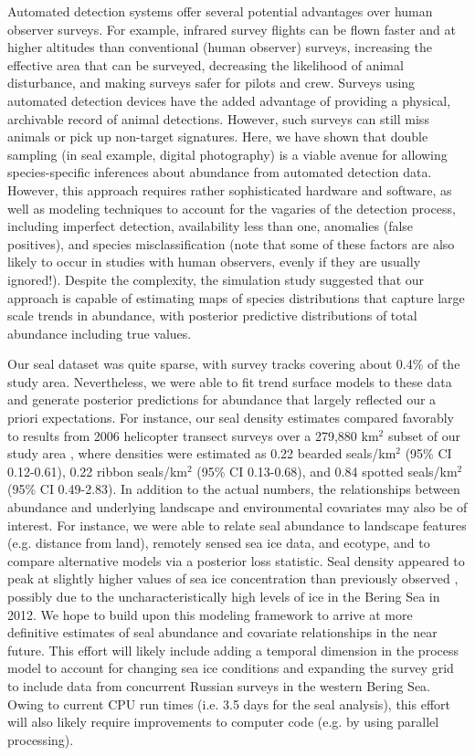 \documentclass[12pt,fleqn]{article}
\begin{document}
\begin{flushleft}
Automated detection systems offer several potential advantages over human observer surveys.  For example, infrared survey flights can be flown faster and at higher altitudes than conventional (human observer) surveys, increasing the effective area that can be surveyed, decreasing the likelihood of animal disturbance, and making surveys safer for pilots and crew.  Surveys using automated detection devices have the added advantage of providing a physical, archivable record of animal detections.
However, such surveys can still miss animals or pick up non-target signatures.  Here, we have shown that double sampling (in seal example, digital photography) is a viable avenue for allowing species-specific inferences about abundance from automated detection data.  However, this approach requires rather sophisticated hardware and software, as well as modeling techniques to account for the vagaries of the detection process, including imperfect detection, availability less than one, anomalies (false positives), and species misclassification (note that some of these factors are also likely to occur in studies with human observers, evenly if they are usually ignored!).
Despite the complexity, the simulation study suggested that our approach is capable of estimating maps of species distributions that capture large scale trends in abundance, with posterior predictive distributions of total abundance including true values.

\hspace{.5in}Our seal dataset was quite sparse, with survey tracks covering about 0.4\% of the study area.  Nevertheless, we were able to fit trend surface models to these data and generate posterior predictions for abundance that largely reflected
our a priori expectations.  For instance, our seal density estimates compared favorably to results from 2006 helicopter transect surveys over a 279,880 km$^2$ subset of our study area \citep{VerHoefEtAl2013}, where densities were estimated as 0.22 bearded seals/km$^2$ (95\% CI 0.12-0.61), 0.22 ribbon seals/km$^2$ (95\% CI 0.13-0.68), and 0.84 spotted seals/km$^2$ (95\% CI 0.49-2.83).
In addition to the actual numbers, the relationships between abundance and underlying landscape and environmental covariates may also be of interest.  For instance, we were able to relate seal abundance to landscape features (e.g. distance from land), remotely sensed sea ice data, and ecotype, and to compare
alternative models via a posterior loss statistic.  Seal density appeared to peak at slightly higher values of sea ice concentration than previously observed \citep[cf.][]{VerHoefEtAl2013}, possibly due to the uncharacteristically high levels of ice in the Bering Sea in 2012. We hope to build upon this modeling framework to arrive at more definitive estimates of seal abundance and covariate relationships in the near future.  This effort will likely include adding a temporal dimension in the process model to account for changing sea ice conditions \citep{VerHoefEtAl2013} and expanding the survey grid to include data from concurrent Russian surveys in the western Bering Sea.  Owing to current CPU run times (i.e. 3.5 days for the seal analysis), this effort will also likely require improvements to computer code (e.g. by using parallel processing).


\end{flushleft}
\end{document}
